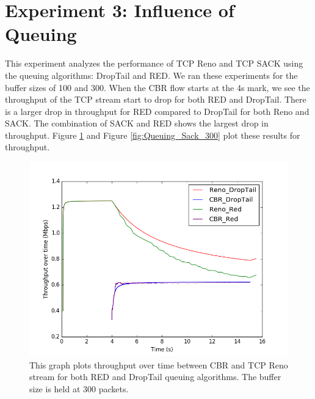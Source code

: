 \section{Experiment 3: Influence of Queuing}
This experiment analyzes the performance of TCP Reno and TCP SACK using the queuing algorithms: DropTail and RED. We ran these experiments for the buffer sizes of 100 and 300. When the CBR flow starts at the 4s mark, we see the throughput of the TCP stream start to drop for both RED and DropTail. There is a larger drop in throughput for RED compared to DropTail for both Reno and SACK. The combination of SACK and RED shows the largest drop in throughput. Figure \ref{fig:Queuing_Reno_300} and Figure \ref{fig:Queuing_Sack_300} plot these results for throughput.
\begin{figure}[!htbp]
	\includegraphics[scale=0.4]{Queuing_Reno_300.png}
	\caption{This graph plots throughput over time between CBR and TCP Reno stream for both RED and DropTail queuing algorithms. The buffer size is held at 300 packets.}
	\label{fig:Queuing_Reno_300}
\end{figure}


